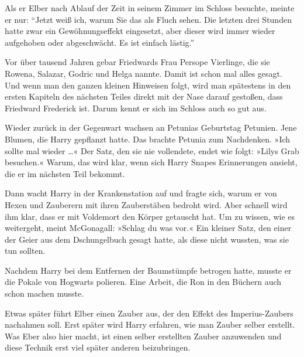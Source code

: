Als er Elber nach Ablauf der Zeit in seinem Zimmer im Schloss besuchte, meinte er nur: \enquote{Jetzt weiß ich, warum Sie das als Fluch sehen. Die letzten drei Stunden hatte zwar ein Gewöhnungseffekt eingesetzt, aber dieser wird immer wieder aufgehoben oder abgeschwächt. Es ist einfach lästig.}




\begin{kommentar}
Vor über tausend Jahren gebar Friedwards Frau Persope Vierlinge, die sie Rowena, Salazar, Godric und Helga nannte. Damit ist schon mal alles gesagt. Und wenn man den ganzen kleinen Hinweisen folgt, wird man spätestens in den ersten Kapiteln des nächsten Teiles direkt mit der Nase darauf gestoßen, dass Friedward Frederick ist. Darum kennt er sich im Schloss auch so gut aus.
\end{kommentar}

\begin{kommentar}
Wieder zurück in der Gegenwart wachsen an Petunias Geburtstag Petunien. Jene Blumen, die Harry gepflanzt hatte. Das brachte Petunia zum Nachdenken. »Ich sollte mal wieder …« Der Satz, den sie nie vollendete, endet wie folgt: »Lilys Grab besuchen.« Warum, das wird klar, wenn sich Harry Snapes Erinnerungen ansieht, die er im nächsten Teil bekommt.
\end{kommentar}

\begin{kommentar}
Dann wacht Harry in der Krankenstation auf und fragte sich, warum er von Hexen und Zauberern mit ihren Zauberstäben bedroht wird. Aber schnell wird ihm klar, dass er mit Voldemort den Körper getauscht hat. Um zu wissen, wie es weitergeht, meint McGonagall: »Schlag du was vor.« Ein kleiner Satz, den einer der Geier aus dem Dschungelbuch gesagt hatte, als diese nicht wussten, was sie tun sollten.
\end{kommentar}

\begin{kommentar}
Nachdem Harry bei dem Entfernen der Baumstümpfe betrogen hatte, musste er die Pokale von Hogwarts polieren. Eine Arbeit, die Ron in den Büchern auch schon machen musste.
\end{kommentar}

\begin{kommentar}
Etwas später führt Elber einen Zauber aus, der den Effekt des Imperius-Zaubers nachahmen soll. Erst später wird Harry erfahren, wie man Zauber selber erstellt. Was Eber also hier macht, ist einen selber erstellten Zauber anzuwenden und diese Technik erst viel später anderen beizubringen.
\end{kommentar}

